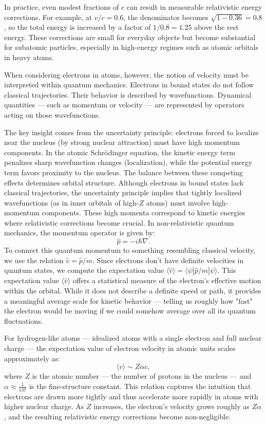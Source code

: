 In practice, even modest fractions of \( c \) can result in measurable relativistic energy corrections. For example, at \( v/c = 0.6 \), the denominator becomes \( \sqrt{1 - 0.36} = 0.8 \), so the total energy is increased by a factor of \( 1/0.8 = 1.25 \) above the rest energy. These corrections are small for everyday objects but become substantial for subatomic particles, especially in high-energy regimes such as atomic orbitals in heavy atoms.

When considering electrons in atoms, however, the notion of velocity must be interpreted within quantum mechanics. Electrons in bound states do not follow classical trajectories. Their behavior is described by wavefunctions. Dynamical quantities — such as momentum or velocity — are represented by operators acting on those wavefunctions.

The key insight comes from the uncertainty principle: electrons forced to localize near the nucleus (by strong nuclear attraction) must have high momentum components. In the atomic Schrödinger equation, the kinetic energy term penalizes sharp wavefunction changes (localization), while the potential energy term favors proximity to the nucleus. The balance between these competing effects determines orbital structure. Although electrons in bound states lack classical trajectories, the uncertainty principle implies that tightly localized wavefunctions (as in inner orbitals of high-$Z$ atoms) must involve high-momentum components. These high momenta correspond to kinetic energies where relativistic corrections become crucial. In non-relativistic quantum mechanics, the momentum operator is given by:
\[
\hat{p} = -i\hbar \nabla.
\]
To connect this quantum momentum to something resembling classical velocity, we use the relation \( \hat{v} = \hat{p}/m \). Since electrons don't have definite velocities in quantum states, we compute the expectation value \( \langle \hat{v} \rangle = \langle \psi | \hat{p}/m | \psi \rangle \). This expectation value \( \langle \hat{v} \rangle \) offers a statistical measure of the electron's effective motion within the orbital. While it does not describe a definite speed or path, it provides a meaningful average scale for kinetic behavior — telling us roughly how "fast" the electron would be moving if we could somehow average over all its quantum fluctuations.

For hydrogen-like atoms — idealized atoms with a single electron and full nuclear charge — the expectation value of electron velocity in atomic units scales approximately as:
\[
\langle v \rangle \sim Z\alpha c,
\]
where \( Z \) is the atomic number — the number of protons in the nucleus — and \( \alpha \approx \tfrac{1}{137} \) is the fine-structure constant. This relation captures the intuition that electrons are drawn more tightly and thus accelerate more rapidly in atoms with higher nuclear charge. As \( Z \) increases, the electron’s velocity grows roughly as \( Z\alpha \), and the resulting relativistic energy corrections become non-negligible.


